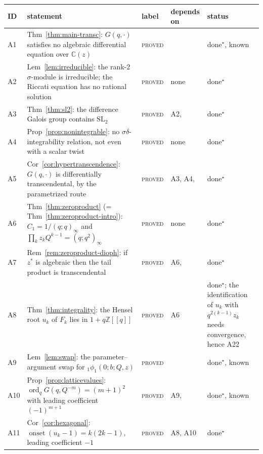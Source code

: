\documentclass[11pt]{article}
\theoremstyle{plain}
\theoremstyle{definition}
\theoremstyle{remark}
\newcommand{\Z}{\mathbb{Z}}
\newcommand{\C}{\mathbb{C}}
\DeclareMathOperator{\ord}{ord}
\begin{document}
\begin{center}
\scriptsize
\begin{tabular}{@{}l>{\raggedright\arraybackslash}p{5.4cm}>{\raggedright\arraybackslash}p{2.4cm}>{\raggedright\arraybackslash}p{1.7cm}>{\raggedright\arraybackslash}p{2.2cm}@{}}
\hline
ID & statement & label & depends on & status\\
\hline
A1 & Thm~\ref{thm:main-transc}: $G(q,\cdot)$ satisfies no algebraic differential equation over
  $\C(z)$ & \textsc{proved} & \cite{ADH2021} & done$^\star$, known\\
A2 & Lem~\ref{lem:irreducible}: the rank-$2$ $\sigma$-module is irreducible; the Riccati equation
  has no rational solution & \textsc{proved} & none & done$^\star$\\
A3 & Thm~\ref{thm:sl2}: the difference Galois group contains $\mathrm{SL}_2$ & \textsc{proved} &
  A2, \cite{RSZ} & done$^\star$\\
A4 & Prop~\ref{prop:nonintegrable}: no $\sigma\delta$-integrability relation, not even with a
  scalar twist & \textsc{proved} & none & done$^\star$\\
A5 & Cor~\ref{cor:hypertranscendence}: $G(q,\cdot)$ is differentially transcendental, by the
  parametrized route & \textsc{proved} & A3, A4, \cite{DHR2018} & done$^\star$\\
A6 & Thm~\ref{thm:zeroproduct} (= Thm~\ref{thm:zeroproduct-intro}): $C_1=1/(q;q)_\infty$ and
  $\prod_kz_kQ^{k-1}=(q;q^2)_\infty$ & \textsc{proved} & none & done$^\star$\\
A7 & Rem~\ref{rem:zeroproduct-dioph}: if $z^\ast$ is algebraic then the tail product is
  transcendental & \textsc{proved} & A6, \cite{Nesterenko} & done$^\star$\\
A8 & Thm~\ref{thm:integrality}: the Hensel root $u_k$ of $F_k$ lies in $1+q\Z[[q]]$ &
  \textsc{proved} & A6 & done$^\star$; the identification of $u_k$ with $q^{2(k-1)}z_k$ needs
  convergence, hence A22\\
A9 & Lem~\ref{lem:swap}: the parameter--argument swap for ${}_1\phi_1(0;b;Q,z)$ &
  \textsc{proved} & \cite{KS1992} & done$^\star$, known\\
A10 & Prop~\ref{prop:latticevalues}: $\ord_qG(q,Q^{-m})=(m+1)^2$ with leading coefficient
  $(-1)^{m+1}$ & \textsc{proved} & A9, \cite{KS1992} & done$^\star$, known\\
A11 & Cor~\ref{cor:hexagonal}: $\operatorname{onset}(u_k-1)=k(2k-1)$, leading coefficient $-1$ &
  \textsc{proved} & A8, A10 & done$^\star$\\

\end{tabular}
\end{center}
\end{document}

